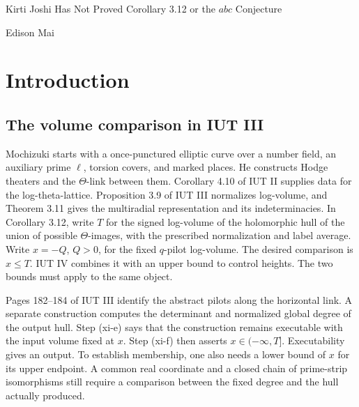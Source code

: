 \documentclass[UTF8,fontset=none,zihao=-4,a4paper]{ctexart}
\newcommand\heiti{\CJKfamily{hei}}
\begin{document}
\clearpage
\begingroup
\renewcommand{\heiti}{\rmfamily}
\markboth{}{}
\renewcommand{\proofname}{Proof}
\setcounter{section}{0}
\setcounter{claim}{0}
\renewcommand{\thesection}{\arabic{section}}
\renewcommand{\theclaim}{\arabic{claim}}
\renewcommand{\theHsection}{english.\arabic{section}}
\renewcommand{\theHclaim}{english.\arabic{claim}}
\setcounter{equation}{0}
\renewcommand{\theHequation}{english.\arabic{equation}}
\begin{center}
{\arial{} Kirti Joshi Has Not Proved Corollary 3.12 or the \(abc\) Conjecture\par}
\vspace{18bp}
Edison Mai
\end{center}

\section{Introduction}
\subsection{The volume comparison in IUT III}
Mochizuki starts with a once-punctured elliptic curve over a number field, an auxiliary prime \(\ell\), torsion covers, and marked places. He constructs Hodge theaters and the \(\Theta\)-link between them. Corollary 4.10 of IUT II supplies data for the log-theta-lattice. Proposition 3.9 of IUT III normalizes log-volume, and Theorem 3.11 gives the multiradial representation and its indeterminacies. In Corollary 3.12, write \(T\) for the signed log-volume of the holomorphic hull of the union of possible \(\Theta\)-images, with the prescribed normalization and label average. Write \(x=-Q\), \(Q>0\), for the fixed \(q\)-pilot log-volume. The desired comparison is \(x\le T\). IUT IV combines it with an upper bound to control heights. The two bounds must apply to the same object.\cite{mi,mii,miii,miv}

Pages 182--184 of IUT III identify the abstract pilots along the horizontal link. A separate construction computes the determinant and normalized global degree of the output hull. Step (xi-e) says that the construction remains executable with the input volume fixed at \(x\). Step (xi-f) then asserts \(x\in(-\infty,T]\). Executability gives an output. To establish membership, one also needs a lower bound of \(x\) for its upper endpoint. A common real coordinate and a closed chain of prime-strip isomorphisms still require a comparison between the fixed degree and the hull actually produced.\cite[pp. 181--185]{miii}
\end{document}
